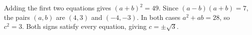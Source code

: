 Adding the first two equations gives $(a+b)^2=49 $. Since $(a-b)(a+b)=7 $, the pairs $(a,b)$ are $(4,3)$ and $(-4,-3)$. In both cases $ a^2+ab=28 $, so $ c^2=3 $. Both signs satisfy every equation, giving $\boxed{c=\pm\sqrt3}$.

